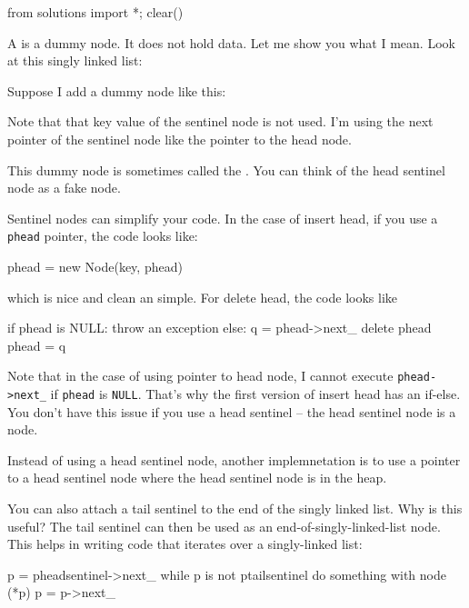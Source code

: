 \begin{python0}
from solutions import *; clear()
\end{python0}

A  is a dummy node.
It does not hold data.
Let me show you what I mean.
Look at this singly linked list:



Suppose I add a dummy node like this:



Note that that key value of the sentinel node is not used.
I'm using the next pointer of the sentinel node like the pointer to
the head node.

This dummy node is sometimes called the .
You can think of the head sentinel node as a fake node.

Sentinel nodes can simplify your code.
In the case of insert head, if you use a \verb!phead! pointer, the
code looks like:
\begin{console}
phead = new Node(key, phead)
\end{console}
which is nice and clean an simple.
For delete head, the code looks like
\begin{console}
if phead is NULL:
    throw an exception
else:
    q = phead->next_
    delete phead
    phead = q
\end{console}
Note that in the case of using pointer to head node,
I cannot execute \verb!phead->next_! if \verb!phead! is \verb!NULL!.
That's why the first version of insert head has an if-else.
You don't have this issue if you use a head sentinel --
the head sentinel node is a node.

Instead of using a head sentinel node,
another implemnetation is to use a pointer to a head sentinel node
where the head sentinel node is in the heap.

You can also attach a tail sentinel to the end of the
singly linked list.
Why is this useful?
The tail sentinel can then be used as an end-of-singly-linked-list node.
This helps in writing code that iterates over a singly-linked list:
\begin{console}
p = pheadsentinel->next_
while p is not ptailsentinel
{
    do something with node (*p)
    p = p->next_
}
\end{console}
